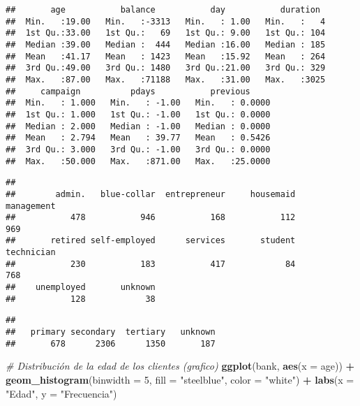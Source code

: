 \documentclass[
]{article}
\newenvironment{Shaded}{\begin{snugshade}}{\end{snugshade}}
\newcommand{\AttributeTok}[1]{\textcolor[rgb]{0.13,0.29,0.53}{#1}}
\newcommand{\CommentTok}[1]{\textcolor[rgb]{0.56,0.35,0.01}{\textit{#1}}}
\newcommand{\DecValTok}[1]{\textcolor[rgb]{0.00,0.00,0.81}{#1}}
\newcommand{\FunctionTok}[1]{\textcolor[rgb]{0.13,0.29,0.53}{\textbf{#1}}}
\newcommand{\NormalTok}[1]{#1}
\newcommand{\SpecialCharTok}[1]{\textcolor[rgb]{0.81,0.36,0.00}{\textbf{#1}}}
\newcommand{\StringTok}[1]{\textcolor[rgb]{0.31,0.60,0.02}{#1}}
\begin{document}
\begin{verbatim}
##       age           balance           day           duration   
##  Min.   :19.00   Min.   :-3313   Min.   : 1.00   Min.   :   4  
##  1st Qu.:33.00   1st Qu.:   69   1st Qu.: 9.00   1st Qu.: 104  
##  Median :39.00   Median :  444   Median :16.00   Median : 185  
##  Mean   :41.17   Mean   : 1423   Mean   :15.92   Mean   : 264  
##  3rd Qu.:49.00   3rd Qu.: 1480   3rd Qu.:21.00   3rd Qu.: 329  
##  Max.   :87.00   Max.   :71188   Max.   :31.00   Max.   :3025  
##     campaign          pdays           previous      
##  Min.   : 1.000   Min.   : -1.00   Min.   : 0.0000  
##  1st Qu.: 1.000   1st Qu.: -1.00   1st Qu.: 0.0000  
##  Median : 2.000   Median : -1.00   Median : 0.0000  
##  Mean   : 2.794   Mean   : 39.77   Mean   : 0.5426  
##  3rd Qu.: 3.000   3rd Qu.: -1.00   3rd Qu.: 0.0000  
##  Max.   :50.000   Max.   :871.00   Max.   :25.0000
\end{verbatim}

\begin{Shaded}
\end{Shaded}

\begin{verbatim}
## 
##        admin.   blue-collar  entrepreneur     housemaid    management 
##           478           946           168           112           969 
##       retired self-employed      services       student    technician 
##           230           183           417            84           768 
##    unemployed       unknown 
##           128            38
\end{verbatim}

\begin{Shaded}
\end{Shaded}

\begin{verbatim}
## 
##   primary secondary  tertiary   unknown 
##       678      2306      1350       187
\end{verbatim}

\begin{Shaded}
\begin{Highlighting}[]
\CommentTok{\# Distribución de la edad de los clientes (grafico)}
\FunctionTok{ggplot}\NormalTok{(bank, }\FunctionTok{aes}\NormalTok{(}\AttributeTok{x =}\NormalTok{ age)) }\SpecialCharTok{+}
  \FunctionTok{geom\_histogram}\NormalTok{(}\AttributeTok{binwidth =} \DecValTok{5}\NormalTok{, }\AttributeTok{fill =} \StringTok{"steelblue"}\NormalTok{, }\AttributeTok{color =} \StringTok{"white"}\NormalTok{) }\SpecialCharTok{+}
  \FunctionTok{labs}\NormalTok{(}\AttributeTok{x =} \StringTok{"Edad"}\NormalTok{, }\AttributeTok{y =} \StringTok{"Frecuencia"}\NormalTok{)}
\end{Highlighting}
\end{Shaded}
\end{document}
